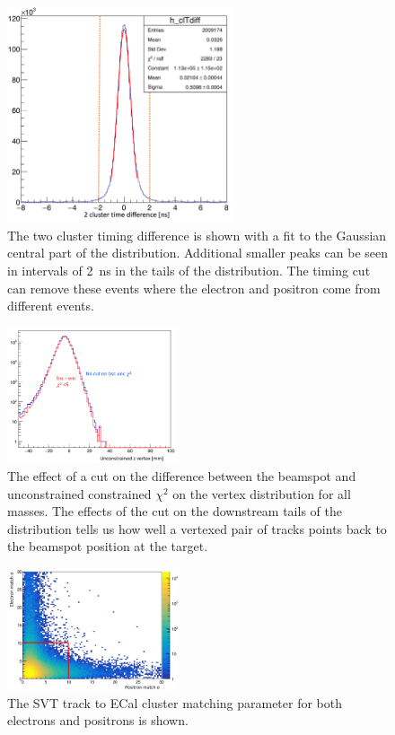 \begin{figure}[htb]
  \centering
      \includegraphics[width=0.6\textwidth]{pics/searching/cltdiff.png}
  \caption[Cut on the cluster pair time difference]{The two cluster timing difference is shown with a fit to the Gaussian central part of the distribution. Additional smaller peaks can be seen in intervals of 2~ns in the tails of the distribution. The timing cut can remove these events where the electron and positron come from different events.}
  \label{fig:cltdiff}
\end{figure} 
\begin{figure}[htb]
  \centering
      \includegraphics[width=0.45\textwidth]{pics/searching/bmuchi2.png}
  \caption[Vertex cut on the difference between beamspot and unconstrained $\chi^2$]{The effect of a cut on the difference between the beamspot and unconstrained constrained $\chi^2$ on the vertex distribution for all masses. The effects of the cut on the downstream tails of the distribution tells us how well a vertexed pair of tracks points back to the beamspot position at the target.}
  \label{fig:bmucut}
\end{figure} 
\begin{figure}[htb]
  \centering
      \includegraphics[width=0.45\textwidth]{pics/searching/matchcut.png}
  \caption[Cut on the track-cluster matching]{The SVT track to ECal cluster matching parameter for both electrons and positrons is shown.}
  \label{fig:matchcut}
\end{figure}

